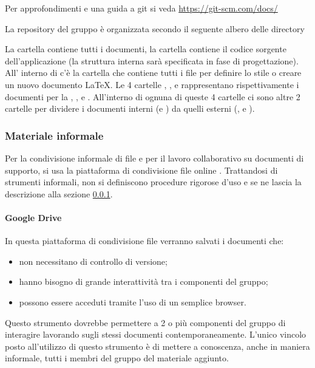 \documentclass[12pt,a4paper]{article}
\begin{document}
Per approfondimenti e una guida a git si veda \url{https://git-scm.com/docs/}

La repository del gruppo è organizzata secondo il seguente albero delle directory


La cartella  contiene tutti i documenti, la cartella  contiene il codice sorgente dell'applicazione (la struttura interna sarà specificata in fase di progettazione). All' interno di  c'è la cartella  che contiene tutti i file per definire lo stile o creare un nuovo documento \LaTeX{}. Le 4 cartelle , ,  e  rappresentano rispettivamente i documenti per la \RR, \RP, \RQ e \RA. All'interno di ognuna di queste 4 cartelle ci sono altre 2 cartelle per dividere i documenti interni (\NdP e \SdF) da quelli esterni (\AdR, \PdP e \PdQ).

\subsubsection{Materiale informale}\label{sec:matinf}
Per la condivisione informale di file e per il lavoro collaborativo su documenti di supporto, si usa la piattaforma di condivisione file online . Trattandosi di strumenti informali, non si definiscono procedure rigorose d’uso e se ne lascia la descrizione alla sezione \ref{sec:matinf}.

\paragraph{Google Drive}
In questa piattaforma di condivisione file verranno salvati i documenti che:
\begin{itemize}
	\item non necessitano di controllo di versione;
	\item hanno bisogno di grande interattività tra i componenti del gruppo;
	\item possono essere acceduti tramite l’uso di un semplice browser.
\end{itemize}

Questo strumento dovrebbe permettere a 2 o più componenti del gruppo di interagire lavorando sugli stessi documenti contemporaneamente.
L'unico vincolo posto all'utilizzo di questo strumento è di mettere a conoscenza, anche in maniera informale, tutti i membri del gruppo del materiale aggiunto.
\end{document}
